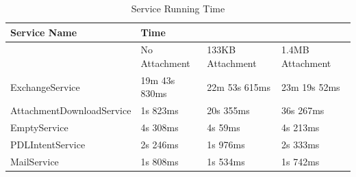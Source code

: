 \documentclass[a4paper,12pt]{article}
\begin{document}
\begin{table}[!h]
\centering
\caption{Service Running Time}
\label{my-label}
\begin{tabular}{|l|l|l|l|}
\hline
Service Name              & \multicolumn{3}{P{10cm}|}{Time}                           \\ \hline
                          & No Attachment & 133KB Attachment & 1.4MB Attachment \\ \hline
ExchangeService           & 19m 43s 830ms & 22m 53s 615ms    & 23m 19s 52ms     \\ \hline
AttachmentDownloadService & 1s 823ms      & 20s 355ms        & 36s 267ms        \\ \hline
EmptyService              & 4s 308ms      & 4s 59ms          & 4s 213ms         \\ \hline
PDLIntentService          & 2s 246ms      & 1s 976ms         & 2s 333ms         \\ \hline
MailService               & 1s 808ms      & 1s 534ms         & 1s 742ms         \\ \hline
\end{tabular}
\end{table}
\end{document}

